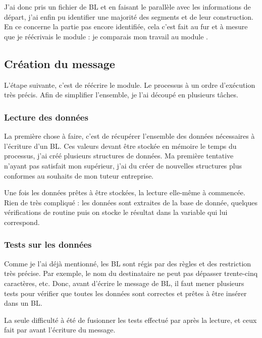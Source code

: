 ~


~

J'ai donc pris un fichier de BL et en faisant le parallèle avec les informations de départ, j'ai enfin pu identifier une majorité des segments et de leur construction. En ce concerne la partie pas encore identifiée, cela c'est fait au fur et à mesure que je réécrivais le module : je comparais mon travail au module \pireus.

\subsection{Création du message}
L'étape suivante, c'est de réécrire le module. Le processus à un ordre d'exécution très précis. Afin de simplifier l'ensemble, je l'ai découpé en plusieurs tâches.

\subsubsection{Lecture des données}
La première chose à faire, c'est de récupérer l'ensemble des données nécessaires à l'écriture d'un BL. Ces valeurs devant être stockée en mémoire le temps du processus, j'ai créé plusieurs structures de données. Ma première tentative n'ayant pas satisfait mon supérieur, j'ai du créer de nouvelles structures plus conformes au souhaits de mon tuteur entreprise.

Une fois les données prêtes à être stockées, la lecture elle-même à commencée. Rien de très compliqué : les données sont extraites de la base de donnée, quelques vérifications de routine puis on stocke le résultat dans la variable qui lui correspond.

\vfill

\subsubsection{Tests sur les données}
Comme je l'ai déjà mentionné, les BL sont régis par des règles et des restriction très précise. Par exemple, le nom du destinataire ne peut pas dépasser trente-cinq caractères, etc. Donc, avant d'écrire le message de BL, il faut mener plusieurs tests pour vérifier que toutes les données sont correctes et prêtes à être insérer dans un BL.

La seule difficulté à été de fusionner les tests effectué par \integrale{} après la lecture, et ceux fait par \pireus{} avant l'écriture du message.
